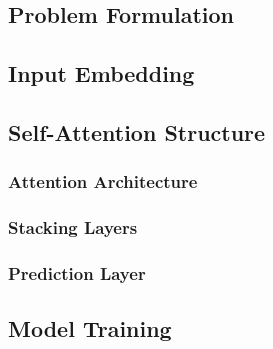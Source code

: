 \subsection{Problem Formulation}


\subsection{Input Embedding}
\label{section:inputembedding}


\subsection{Self-Attention Structure}
\subsubsection{Attention Architecture}


\subsubsection{Stacking Layers}


\subsubsection{Prediction Layer}


\subsection{Model Training}
